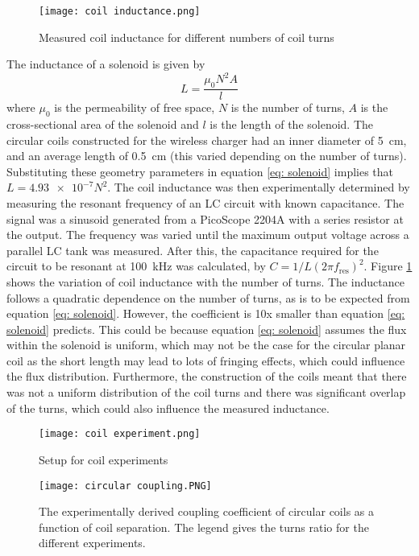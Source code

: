 \begin{figure}[htbp]
	\centering
	\texttt{[image: coil inductance.png]}
	\caption{Measured coil inductance for different numbers of coil turns}
	\label{fig: coil inductance}
\end{figure}

The inductance of a solenoid is given by 
\begin{equation}\label{eq: solenoid}
L = \frac{\mu_0 N^2 A}{l}
\end{equation}
where $\mu_0$ is the permeability of free space, $N$ is the number of turns, $A$ is the cross-sectional area of the solenoid and $l$ is the length of the solenoid. The circular coils constructed for the wireless charger had an inner diameter of \SI{5}{\centi\metre}, and an average length of \SI{0.5}{\centi\metre} (this varied depending on the number of turns). Substituting these geometry parameters in equation \ref{eq: solenoid} implies that $L=\num{4.93e-7}N^2$. The coil inductance was then experimentally determined by measuring the resonant frequency of an LC circuit with known capacitance. The signal was a sinusoid generated from a PicoScope 2204A \cite{picoscope} with a series resistor at the output. The frequency was varied until the maximum output voltage across a parallel LC tank was measured. After this, the capacitance required for the circuit to be resonant at \SI{100}{\kilo\hertz} was calculated, by $C = 1/L(2\pi f_\text{res})^2$. Figure \ref{fig: coil inductance} shows the variation of coil inductance with the number of turns. The inductance follows a quadratic dependence on the number of turns, as is to be expected from equation \ref{eq: solenoid}. However, the coefficient is 10x smaller than equation \ref{eq: solenoid} predicts. This could be because equation \ref{eq: solenoid} assumes the flux within the solenoid is uniform, which may not be the case for the circular planar coil as the short length may lead to lots of fringing effects, which could influence the flux distribution. Furthermore, the construction of the coils meant that there was not a uniform distribution of the coil turns and there was significant overlap of the turns, which could also influence the measured inductance.\\

\begin{figure}[htbp]
	\centering
	\texttt{[image: coil experiment.png]}
	\caption{Setup for coil experiments}
	\label{fig: coil experiment setup}
\end{figure}
\begin{figure}[htbp]
	\centering
	\texttt{[image: circular coupling.PNG]}
	\caption{The experimentally derived coupling coefficient of circular coils as a function of coil separation. The legend gives the turns ratio for the different experiments.}
	\label{fig: circular coupling}
\end{figure}

